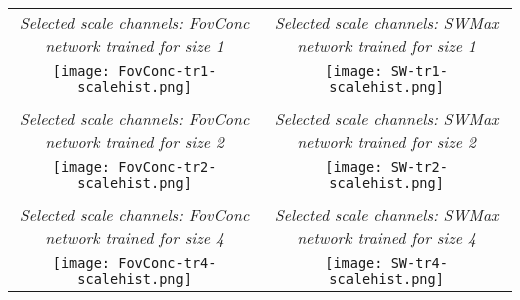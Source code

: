 \documentclass[twocolumn,runningheads]{svjour3}
\begin{document}
\begin{figure*}[hbtp]
\begin{center}
   \begin{tabular}{cc}
     {\em Selected scale channels: FovConc network trained for size 1}
     & {\em Selected scale channels: SWMax network trained for size 1} \\
     \texttt{[image: FovConc-tr1-scalehist.png]}
     & \texttt{[image: SW-tr1-scalehist.png]}\\
     \\
     {\em Selected scale channels: FovConc network trained for size 2}
     & {\em Selected scale channels: SWMax network trained for size 2} \\
     \texttt{[image: FovConc-tr2-scalehist.png]}
     & \texttt{[image: SW-tr2-scalehist.png]}\\
      \\
     {\em Selected scale channels: FovConc network trained for size 4}
     & {\em Selected scale channels: SWMax network trained for size 4} \\
     \texttt{[image: FovConc-tr4-scalehist.png]}
     & \texttt{[image: SW-tr4-scalehist.png]}\\
    \end{tabular}
  \end{center}
  \caption{\emph{Visualisation of the scale selection properties of the not scale-invariant FovConc and SWMax
    networks, when training the network for each one
    of the sizes 1, 2 and 4}. For each testing size, shown on the
    horizontal axis with increasing testing sizes towards the right, the vertical axis displays a histogram of the relative contribution of the scale channels to the winning classification, with the
    lowest scale at the bottom and the highest scale at the top. As can be
    seen from the figures, the relative contributions from the
    different scale levels do not as well follow a linear dependency
    on the size of the input structures as for the scale-invariant FovAvg and FovMax
    networks. Instead, for the FocConc network, there is a bias
    towards the size of image structures used for training, whereas
    for the SWMax network some scale levels dominate for fine-scale or
    coarse-scale sizes in the testing data. (In these figures, the
resolution parameter on the vertical axis represents the inverse of
scale. Note that the grey-levels in the histograms are not directly
comparable, since the grey-levels for each histogram are normalised
with respect to the maximum and minimum values in that histogram.)}
   \label{fig-sc-sel-FovConc-SWMax}
\end{figure*}
\end{document}
